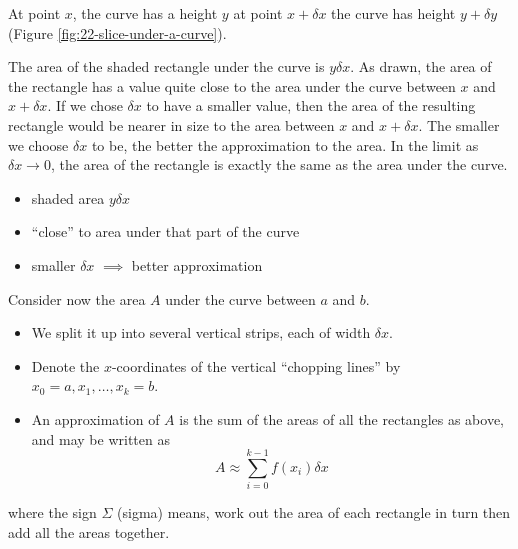 \documentclass[
  11pt,
  oneside]{book}
\providecommand{\tightlist}{%
  \setlength{\itemsep}{0pt}\setlength{\parskip}{0pt}}
\newcommand{\slide}{}
\theoremstyle{definition}
\theoremstyle{definition}
\theoremstyle{definition}
\theoremstyle{definition}
\theoremstyle{remark}
\begin{document}
At point \(x\), the curve has a height \(y\) at point \(x + \delta x\) the curve has height \(y + \delta y\) (Figure \ref{fig:22-slice-under-a-curve}).

\begin{notslides}

The area of the shaded rectangle under the curve is \(y\delta x\). As drawn, the area of the rectangle has a value quite close to the area under the curve between \(x\) and \(x + \delta x\). If we chose \(\delta x\) to have a smaller value, then the area of the resulting rectangle would be nearer in size to the area between \(x\) and \(x + \delta x\). The smaller we choose \(\delta x\) to be, the better the approximation to the area. In the limit as \(\delta x \to 0\), the area of the rectangle is exactly the same as the area under the curve.

\end{notslides}

\begin{slidesonly}

\vfill

\begin{itemize}
\tightlist
\item
  shaded area \(y\delta x\)
\item
  ``close'' to area under that part of the curve
\item
  smaller \(\delta x\) \(\implies\) better approximation
\end{itemize}

\vfill
\slide

\end{slidesonly}

Consider now the area \(A\) under the curve between \(a\) and \(b\).

\begin{itemize}
\tightlist
\item
  We split it up into several vertical strips, each of width \(\delta x\).
\item
  Denote the \(x\)-coordinates of the vertical ``chopping lines'' by \(x_0=a, x_1, \dots, x_k=b\).
\item
  An approximation of \(A\) is the sum of the areas of all the rectangles as above, and may be written as
  \[
  A\approx\sum_{i=0}^{k-1}f(x_i)\delta x
  \]
\end{itemize}

\begin{notslides}

where the sign \(\Sigma\) (sigma) means, work out the area of each rectangle in turn then add all the areas together.

\end{notslides}
\end{document}
